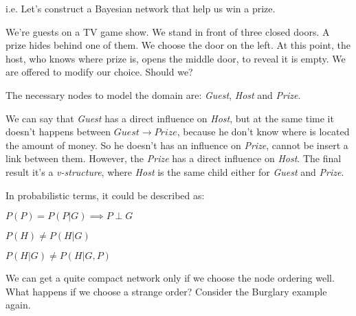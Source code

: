 \begin{example}
    i.e. Let's construct a Bayesian network that help us win a prize. \vspace{3.5pt}

    We're guests on a TV game show. We stand in front of three closed doors. A prize hides behind one of them. We choose the door on the left. At this point, the host,
    who knows where prize is, opens the middle door, to reveal it is empty. We are offered to modify our choice. Should we? \vspace{7pt}

    The necessary nodes to model the domain are: \textit{Guest}, \textit{Host} and \textit{Prize}. \vspace{3.5pt}

    We can say that \textit{Guest} has a direct influence on \textit{Host}, but at the same time it doesn't happens between \textit{$Guest \rightarrow Prize$},
    because he don't know where is located the amount of money. So he doesn't has an influence on \textit{Prize}, cannot be insert a link between them. However, the \textit{Prize}
    has a direct influence on \textit{Host}. The final result it's a \textit{v-structure}, where \textit{Host} is the same child either for \textit{Guest} and \textit{Prize}. \vspace{3.5pt}
    
    In probabilistic terms, it could be described as: \vspace{3.5pt}
    
    $P(P) = P(P|G) \implies P \perp G$

    $P(H) \neq P(H|G)$

    $P(H|G) \neq P(H|G, P)$
\end{example}
We can get a quite compact network only if we choose the node ordering well. What happens if we choose a strange order? Consider the Burglary example again.
